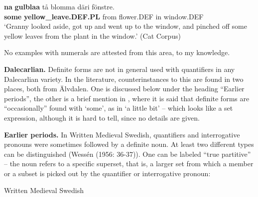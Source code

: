  \ea\label{}
\gll \textbf{na}\textbf{  gulblaa} tå  blomma  däri  fönstre.\\


\textbf{some} \textbf{yellow\_leave.DEF.PL} from  flower.DEF  in  window.DEF\\

\glt ‘Granny looked aside, got up and went up to the window, and pinched off some yellow leaves from the plant in the window.’ (Cat Corpus)

\z

No examples with numerals are attested from this area, to my knowledge.


\textbf{Dalecarlian. }Definite forms are not in general used with quantifiers in any Dalecarlian variety. In the literature, counterinstances to this are found in two places, both from Älvdalen. One is discussed below under the heading “Earlier periods”, the other is a brief mention in \citet[95]{Levander1909}, where it is said that definite forms are “occasionally” found with ‘some’, as in ‘a little bit’ – which looks like a set expression, although it is hard to tell, since no details are given.


\textbf{Earlier periods.} In Written Medieval Swedish, quantifiers and interrogative pronouns were sometimes followed by a definite noun. At least two different types can be distinguished (Wessén (1956: 36-37)). One can be labeled “true partitive” – the noun refers to a specific superset, that is, a larger set from which a member or a subset is picked out by the quantifier or interrogative pronoun:


\item 

Written Medieval Swedish



